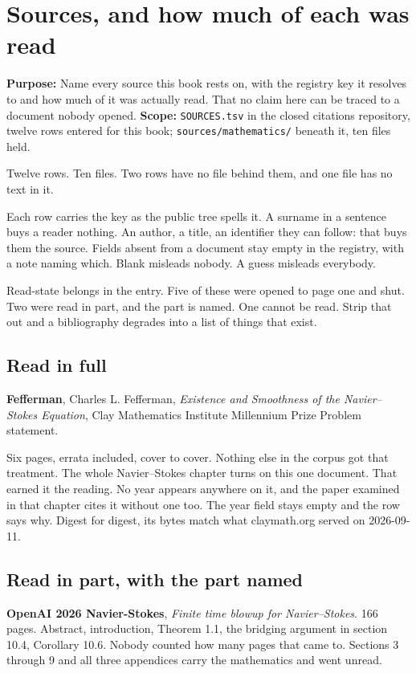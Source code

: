 \chapter{Sources, and how much of each was read}

\textbf{Purpose:} Name every source this book rests on, with the registry key it resolves to and
how much of it was actually read. That no claim here can be traced to a document nobody opened.
\textbf{Scope:} \texttt{SOURCES.\allowbreak{}tsv} in the closed citations repository, twelve rows
entered for this book; \texttt{sources/\allowbreak{}mathematics/\allowbreak{}} beneath it, ten
files held.

Twelve rows. Ten files. Two rows have no file behind them, and one file has no text in it.

Each row carries the key as the public tree spells it. A surname in a sentence buys a reader
nothing. An author, a title, an identifier they can follow: that buys them the source. Fields absent
from a document stay empty in the registry, with a note naming which. Blank misleads nobody. A
guess misleads everybody.

Read-state belongs in the entry. Five of these were opened to page one and shut. Two were read in
part, and the part is named. One cannot be read. Strip that out and a bibliography degrades into a
list of things that exist.

\section{Read in full}

\textbf{Fefferman}, Charles L. Fefferman, \emph{Existence and Smoothness of the Navier--Stokes
Equation}, Clay Mathematics Institute Millennium Prize Problem statement.

Six pages, errata included, cover to cover. Nothing else in the corpus got that treatment. The
whole Navier--Stokes chapter turns on this one document. That earned it the reading. No year appears
anywhere on it, and the paper examined in that chapter cites it without one too. The year field
stays empty and the row says why. Digest for digest, its bytes match what claymath.org served on
2026-09-11.

\section{Read in part, with the part named}

\textbf{OpenAI 2026 Navier-Stokes}, \emph{Finite time blowup for Navier--Stokes}. 166 pages.
Abstract, introduction, Theorem 1.1, the bridging argument in section 10.4, Corollary 10.6. Nobody
counted how many pages that came to. Sections 3 through 9 and all three appendices carry the
mathematics and went unread.

